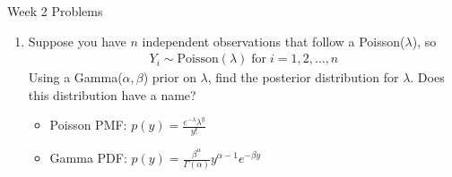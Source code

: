 \documentclass[10pt,a4paper]{article}
\author{Patrick Lam}
\begin{document}
\begin{center}
\begin{Large}Week 2 Problems\end{Large}
\end{center}
\bigskip
\begin{enumerate}


\item Suppose you have $n$ independent observations that follow a Poisson($\lambda$), so
\begin{eqnarray*}
Y_i \sim \mathrm{Poisson}(\lambda) \; \mathrm{for} \; i = 1,2,\dots,n
\end{eqnarray*}
Using a Gamma($\alpha, \beta$) prior on $\lambda$, find the posterior distribution for $\lambda$.  Does this distribution have a name?

\begin{itemize}
\item Poisson PMF: $p(y) = \frac{e^{-\lambda} \lambda^y}{y!}$
\item Gamma PDF: $p(y) = \frac{\beta^{\alpha}}{\Gamma(\alpha)} y^{\alpha-1} e^{-\beta y}$
\end{itemize}
\end{enumerate}
\end{document}
